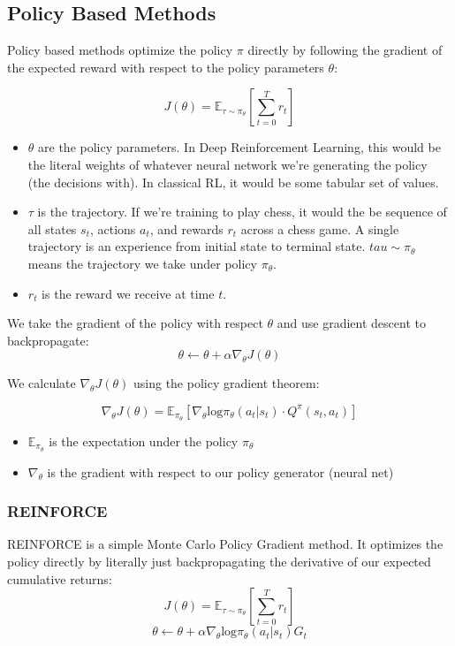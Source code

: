 \documentclass[12pt]{article}
\begin{document}
\subsection{Policy Based Methods}
Policy based methods optimize the policy \(\pi\) directly by following the gradient of the expected reward with respect to the policy parameters \(\theta\):

\[J(\theta) = \mathbb{E}_{\tau \sim \pi_\theta}\left[\sum_{t=0}^Tr_t\right]\]
\begin{itemize}
\item \(\theta\) are the policy parameters. In Deep Reinforcement Learning,  this would be the literal weights of whatever neural network we're generating the policy (the decisions with). In classical RL, it would be some tabular set of values.
\item \(\tau\) is the trajectory. If we're training to play chess, it would the be sequence of all states \(s_t\), actions \(a_t\), and rewards \(r_t\) across a chess game. A single trajectory is an experience from initial state to terminal state. \(tau \sim \pi_\theta\) means the trajectory we take under policy \(\pi_\theta\).
\item \(r_t\) is the reward we receive at time \(t\).
\end{itemize}

We take the gradient of the policy with respect \(\theta\) and use gradient descent to backpropagate:
\[\theta \leftarrow \theta + \alpha \nabla_\theta J(\theta)\]

We calculate \( \nabla_\theta J(\theta)\) using the policy gradient theorem:

\[\nabla_\theta J(\theta) = \mathbb{E}_{\pi_\theta}\left[\nabla_\theta \text{log}\pi_\theta(a_t | s_t) \cdot Q^\pi (s_t, a_t)\right]\]
\begin{itemize}
\item \(\mathbb{E}_{\pi_\theta}\) is the expectation under the policy \(\pi_\theta\)
\item \(\nabla_\theta\) is the gradient with respect to our policy generator (neural net)
\end{itemize}
\subsubsection{REINFORCE}
REINFORCE is a simple Monte Carlo Policy Gradient method. It optimizes the policy directly by literally just backpropagating the derivative of our expected cumulative returns:
\[J(\theta) = \mathbb{E}_{\tau \sim \pi_\theta}\left[\sum_{t=0}^Tr_t\right]\]
\[\theta \leftarrow \theta + \alpha \nabla_\theta \text{log}\pi_\theta (a_t | s_t)G_t\]
\end{document}
